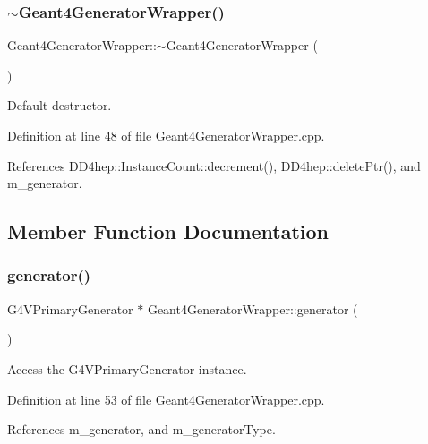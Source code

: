 \subsubsection{\texorpdfstring{$\sim$\+Geant4\+Generator\+Wrapper()}{~Geant4GeneratorWrapper()}}
{\footnotesize\ttfamily Geant4\+Generator\+Wrapper\+::$\sim$\+Geant4\+Generator\+Wrapper (\begin{DoxyParamCaption}{ }\end{DoxyParamCaption})\hspace{0.3cm}{\ttfamily [virtual]}}



Default destructor. 



Definition at line 48 of file Geant4\+Generator\+Wrapper.\+cpp.



References D\+D4hep\+::\+Instance\+Count\+::decrement(), D\+D4hep\+::delete\+Ptr(), and m\+\_\+generator.



\subsection{Member Function Documentation}
\hypertarget{class_d_d4hep_1_1_simulation_1_1_geant4_generator_wrapper_a9185103e129d36edd74946ec77ef0b6b}{}\label{class_d_d4hep_1_1_simulation_1_1_geant4_generator_wrapper_a9185103e129d36edd74946ec77ef0b6b} 
\subsubsection{\texorpdfstring{generator()}{generator()}}
{\footnotesize\ttfamily G4\+V\+Primary\+Generator $\ast$ Geant4\+Generator\+Wrapper\+::generator (\begin{DoxyParamCaption}{ }\end{DoxyParamCaption})}



Access the G4\+V\+Primary\+Generator instance. 



Definition at line 53 of file Geant4\+Generator\+Wrapper.\+cpp.



References m\+\_\+generator, and m\+\_\+generator\+Type.



